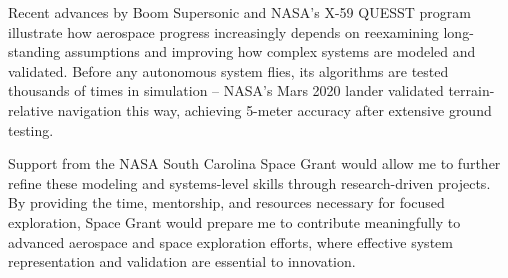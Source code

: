 \documentclass[12pt]{article}
\begin{document}
Recent advances by Boom Supersonic and NASA's X-59 QUESST program illustrate how aerospace progress increasingly depends on reexamining long-standing assumptions and improving how complex systems are modeled and validated. Before any autonomous system flies, its algorithms are tested thousands of times in simulation -- NASA's Mars 2020 lander validated terrain-relative navigation this way, achieving 5-meter accuracy after extensive ground testing.

Support from the NASA South Carolina Space Grant would allow me to further refine these modeling and systems-level skills through research-driven projects. By providing the time, mentorship, and resources necessary for focused exploration, Space Grant would prepare me to contribute meaningfully to advanced aerospace and space exploration efforts, where effective system representation and validation are essential to innovation.
\end{document}
